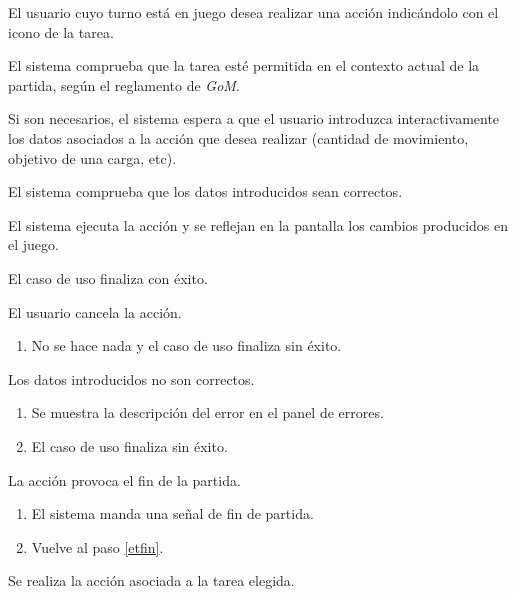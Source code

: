 {
  \item El usuario cuyo turno está en juego desea realizar una acción indicándolo con el icono de la tarea.
  \item El sistema comprueba que la tarea esté permitida en el contexto actual de la partida, según el reglamento de \textit{GoM}. \label{etini}
  \item Si son necesarios, el sistema espera a que el usuario introduzca interactivamente los datos asociados a la acción que desea realizar (cantidad de movimiento, objetivo de una carga, etc).
  \item El sistema comprueba que los datos introducidos sean correctos. \label{etdatos}
  \item El sistema ejecuta la acción y se reflejan en la pantalla los cambios producidos en el juego.\label{etejecuta}
  \item El caso de uso finaliza con éxito. \label{etfin}
}
{
  \item[\ref{etini}-\ref{etdatos}:] El usuario cancela la acción.
    \begin{enumerate}
    \item No se hace nada y el caso de uso finaliza sin éxito.
    \end{enumerate}
  \item[\ref{etdatos}:] Los datos introducidos no son correctos.
    \begin{enumerate}
    \item Se muestra la descripción del error en el panel de errores.
    \item El caso de uso finaliza sin éxito.
    \end{enumerate}
  \item[\ref{etejecuta}:] La acción provoca el fin de la partida.
    \begin{enumerate}
    \item El sistema manda una señal de fin de partida.
\item Vuelve al paso \ref{etfin}.
    \end{enumerate}
}
{Se realiza la acción asociada a la tarea elegida.}
